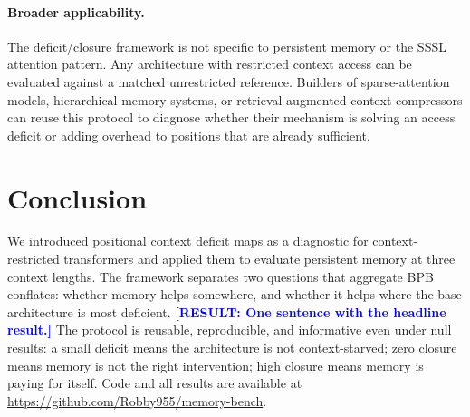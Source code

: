\documentclass[11pt]{article}
\newcommand{\result}[1]{\textcolor{blue}{\textbf{[RESULT: #1]}}}
\begin{document}
\paragraph{Broader applicability.}
The deficit/closure framework is not specific to persistent memory or
the SSSL attention pattern. Any architecture with restricted context
access can be evaluated against a matched unrestricted reference.
Builders of sparse-attention models, hierarchical memory systems, or
retrieval-augmented context compressors can reuse this protocol to
diagnose whether their mechanism is solving an access deficit or
adding overhead to positions that are already sufficient.


\section{Conclusion}
\label{sec:conclusion}

We introduced positional context deficit maps as a diagnostic for
context-restricted transformers and applied them to evaluate persistent
memory at three context lengths. The framework separates two questions
that aggregate BPB conflates: whether memory helps somewhere, and
whether it helps where the base architecture is most deficient.
\result{One sentence with the headline result.}
The protocol is reusable, reproducible, and informative even under
null results: a small deficit means the architecture is not
context-starved; zero closure means memory is not the right
intervention; high closure means memory is paying for itself.
Code and all results are available at
\url{https://github.com/Robby955/memory-bench}.




\end{document}
